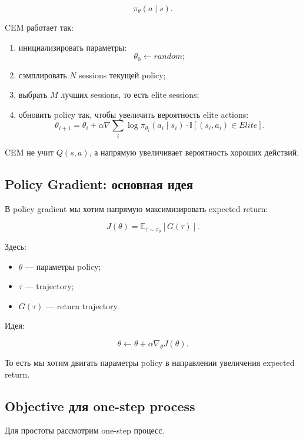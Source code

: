 \documentclass[a4paper,12pt]{article}
\begin{document}
\[
\pi_\theta(a \mid s).
\]

CEM работает так:

\begin{enumerate}
    \item инициализировать параметры:
    \[
    \theta_0 \leftarrow random;
    \]

    \item сэмплировать \(N\) sessions текущей policy;

    \item выбрать \(M\) лучших sessions, то есть elite sessions;

    \item обновить policy так, чтобы увеличить вероятность elite actions:
    \[
    \theta_{i+1}
    =
    \theta_i
    +
    \alpha
    \nabla
    \sum_i
    \log \pi_{\theta_i}(a_i \mid s_i)
    \cdot
    \mathbb{I}[(s_i,a_i)\in Elite].
    \]
\end{enumerate}

CEM не учит \(Q(s,a)\), а напрямую увеличивает вероятность хороших действий.

\subsection{Policy Gradient: основная идея}

В policy gradient мы хотим напрямую максимизировать expected return:

\[
J(\theta)
=
\mathbb{E}_{\tau \sim \pi_\theta}
[
G(\tau)
].
\]

Здесь:

\begin{itemize}
    \item \(\theta\) --- параметры policy;
    \item \(\tau\) --- trajectory;
    \item \(G(\tau)\) --- return trajectory.
\end{itemize}

Идея:

\[
\theta
\leftarrow
\theta
+
\alpha \nabla_\theta J(\theta).
\]

То есть мы хотим двигать параметры policy в направлении увеличения expected return.

\subsection{Objective для one-step process}

Для простоты рассмотрим one-step процесс.
\end{document}

